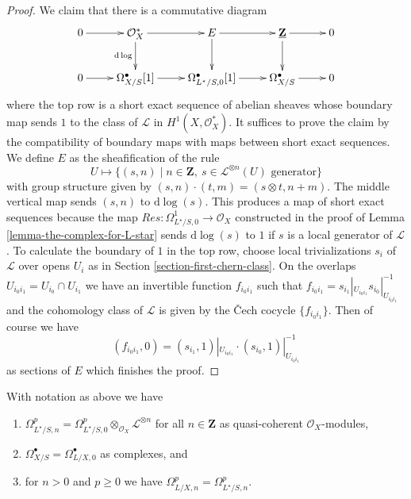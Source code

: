 \begin{proof}
\medskip\noindent
We claim that there is a commutative diagram
$$
\xymatrix{
0 \ar[r] &
\mathcal{O}_X^* \ar[r] \ar[d]_{\text{d}\log} &
E \ar[r] \ar[d] &
\underline{\mathbf{Z}} \ar[d] \ar[r] &
0 \\
0 \ar[r] &
\Omega^\bullet_{X/S}[1] \ar[r] &
\Omega^\bullet_{L^\star/S, 0}[1] \ar[r] &
\Omega^\bullet_{X/S} \ar[r] &
0
}
$$
where the top row is a short exact sequence of abelian sheaves whose
boundary map sends $1$ to the class of $\mathcal{L}$ in
$H^1(X, \mathcal{O}_X^*)$. It suffices to prove the claim
by the compatibility of boundary maps with maps between short
exact sequences. We define $E$ as the sheafification of the rule
$$
U \longmapsto \{(s, n) \mid
n \in \mathbf{Z},\ s \in \mathcal{L}^{\otimes n}(U)\text{ generator}\}
$$
with group structure given by $(s, n) \cdot (t, m) = (s \otimes t, n + m)$.
The middle vertical map sends $(s, n)$ to $\text{d}\log(s)$. This produces
a map of short exact sequences
because the map $Res : \Omega^1_{L^\star/S, 0} \to \mathcal{O}_X$
constructed in the proof of Lemma \ref{lemma-the-complex-for-L-star} sends
$\text{d}\log(s)$ to $1$ if $s$ is a local generator of $\mathcal{L}$.
To calculate the boundary of $1$ in the top row, choose local trivializations
$s_i$ of $\mathcal{L}$ over opens $U_i$ as in
Section \ref{section-first-chern-class}. On the overlaps
$U_{i_0i_1} = U_{i_0} \cap U_{i_1}$
we have an invertible function $f_{i_0i_1}$ such that
$f_{i_0i_1} = s_{i_1}|_{U_{i_0i_1}} s_{i_0}|_{U_{i_0i_1}}^{-1}$
and the cohomology class of $\mathcal{L}$ is given by the {\v C}ech cocycle
$\{f_{i_0i_1}\}$. Then of course we have
$$
(f_{i_0i_1}, 0) = (s_{i_1}, 1)|_{U_{i_0i_1}} \cdot
(s_{i_0}, 1)|_{U_{i_0i_1}}^{-1}
$$
as sections of $E$ which finishes the proof.
\end{proof}

\begin{lemma}
\label{lemma-push-omega-a}
With notation as above we have
\begin{enumerate}
\item $\Omega^p_{L^\star/S, n} =
\Omega^p_{L^\star/S, 0} \otimes_{\mathcal{O}_X} \mathcal{L}^{\otimes n}$
for all $n \in \mathbf{Z}$ as quasi-coherent $\mathcal{O}_X$-modules,
\item $\Omega^\bullet_{X/S} = \Omega^\bullet_{L/X, 0}$
as complexes, and
\item for $n > 0$ and $p \geq 0$ we have
$\Omega^p_{L/X, n} = \Omega^p_{L^\star/S, n}$.
\end{enumerate}
\end{lemma}

